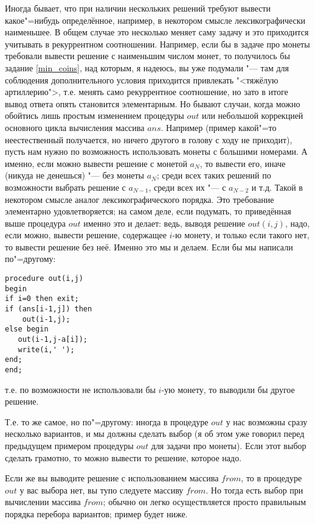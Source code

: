 Иногда бывает, что при наличии нескольких решений требуют вывести какое"=нибудь определённое,
например, в некотором смысле лексикографически наименьшее. В общем случае это несколько меняет саму
задачу и это приходится учитывать в рекуррентном соотношении. Например, если бы в задаче про монеты
требовали вывести решение с наименьшим числом монет, то получилось бы задание \ref{min_coins}, над
которым, я надеюсь, вы уже подумали "--- там для соблюдения дополнительного условия приходится
привлекать "<тяжёлую артиллерию">, т.е. менять само рекуррентное соотношение, но зато в итоге вывод
ответа опять становится элементарным. Но бывают случаи, когда можно обойтись лишь простым изменением
процедуры $out$ или небольшой коррекцией основного цикла вычисления массива $ans$. Например (пример
какой"=то неестественный получается, но ничего другого в голову с ходу не приходит), пусть нам нужно
по возможность использовать монеты с большими номерами. А именно, если можно вывести решение с
монетой $a_N$, то вывести его, иначе (никуда не денешься) "--- без монеты $a_N$; среди всех таких
решений по возможности выбрать решение с $a_{N-1}$, среди всех их "--- с $a_{N-2}$ и т.д. Такой в
некотором смысле аналог лексикографического порядка. Это требование элементарно удовлетворяется; на
самом деле, если подумать, то приведённая выше процедура $out$ именно это и делает: ведь, выводя
решение $out(i,j)$, надо, если можно, вывести решение, содержащее $i$-ю монету, и только если такого
нет, то вывести решение без неё. Именно это мы и делаем. Если бы мы написали по"=другому:
\begin{codesampleo}\begin{verbatim}
procedure out(i,j)
begin
if i=0 then exit;
if (ans[i-1,j]) then 
    out(i-1,j);
else begin
   out(i-1,j-a[i]);
   write(i,' ');
end;
end;
\end{verbatim}\end{codesampleo}
т.е. по возможности не использовали бы $i$-ую монету, то выводили бы другое решение. 

Т.е. то же самое, но по"=другому: иногда в процедуре $out$ у нас возможны сразу несколько вариантов, и мы должны сделать выбор (я об этом уже говорил перед предыдущем примером процедуры $out$ для задачи про монеты). Если этот выбор сделать грамотно, то можно вывести то решение, которое надо.

Если же вы выводите решение с использованием массива $from$, то в процедуре $out$ у вас выбора нет, вы тупо следуете массиву $from$. Но тогда есть выбор при вычислении массива $from$; обычно он легко осуществляется просто правильным порядка перебора вариантов; пример будет ниже.

